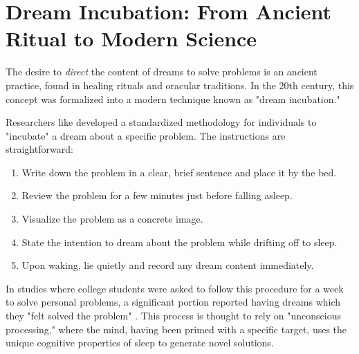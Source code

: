 \section{Dream Incubation: From Ancient Ritual to Modern Science}\label{sec:dream_incubation}

The desire to \textit{direct} the content of dreams to solve problems is an ancient practice, found in healing rituals and oracular traditions. In the 20th century, this concept was formalized into a modern technique known as "dream incubation."

Researchers like \citet{barrett1993committee} developed a standardized methodology for individuals to "incubate" a dream about a specific problem. The instructions are straightforward:
\begin{enumerate}
    \item Write down the problem in a clear, brief sentence and place it by the bed.
    \item Review the problem for a few minutes just before falling asleep.
    \item Visualize the problem as a concrete image.
    \item State the intention to dream about the problem while drifting off to sleep.
    \item Upon waking, lie quietly and record any dream content immediately.
\end{enumerate}

In studies where college students were asked to follow this procedure for a week to solve personal problems, a significant portion reported having dreams which they "felt solved the problem" \citep{barrett1DREAMING}. This process is thought to rely on "unconscious processing," where the mind, having been primed with a specific target, uses the unique cognitive properties of sleep to generate novel solutions.
